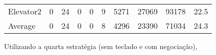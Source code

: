 ﻿\documentclass[a4paper]{article}
\begin{document}
\begin{table}[h]
\begin{tabular}{@{}llllllllll@{}}
Elevator2 & 0        & 24            & 0           & 0                                                               & 9                                                                  & 5271                                                         & 27069                                                 & 93178                                                   & 22.5         \\
Average   & 0     & 24         & 0        & 0                                                               & 8                                                               & 4296                                                         & 23390                                                 &  71034                                                  & 24.3         \\ \bottomrule
\end{tabular}
\end{table}

Utilizando a quarta estratégia (sem teclado e com negociação),
\end{document}
